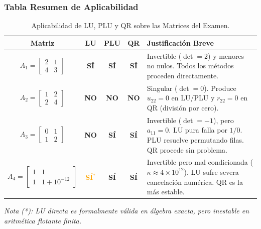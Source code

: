 \documentclass[11pt,a4paper]{article}
\theoremstyle{definition}
\theoremstyle{remark}
\begin{document}
\subsubsection{Tabla Resumen de Aplicabilidad}

\begin{table}[h!]
    \centering
    \renewcommand{\arraystretch}{1.3}
    \caption{Aplicabilidad de LU, PLU y QR sobre las Matrices del Examen.}
    \label{tab:resumen_matrices_examen}
    \begin{tabular}{ccccp{8.5cm}}
        \toprule
        \textbf{Matriz} & \textbf{LU} & \textbf{PLU} & \textbf{QR} & \textbf{Justificación Breve} \\
        \midrule
        $A_1 = \begin{bmatrix} 2 & 1 \\ 4 & 3 \end{bmatrix}$ & 
        \textcolor{mygreen}{\textbf{SÍ}} & 
        \textcolor{mygreen}{\textbf{SÍ}} & 
        \textcolor{mygreen}{\textbf{SÍ}} & 
        Invertible ($\det=2$) y menores no nulos. Todos los métodos proceden directamente. \\
        \midrule
        $A_2 = \begin{bmatrix} 1 & 2 \\ 2 & 4 \end{bmatrix}$ & 
        \textcolor{myred}{\textbf{NO}} & 
        \textcolor{myred}{\textbf{NO}} & 
        \textcolor{myred}{\textbf{NO}} & 
        Singular ($\det=0$). Produce $u_{22}=0$ en LU/PLU y $r_{22}=0$ en QR (división por cero). \\
        \midrule
        $A_3 = \begin{bmatrix} 0 & 1 \\ 1 & 2 \end{bmatrix}$ & 
        \textcolor{myred}{\textbf{NO}} & 
        \textcolor{mygreen}{\textbf{SÍ}} & 
        \textcolor{mygreen}{\textbf{SÍ}} & 
        Invertible ($\det=-1$), pero $a_{11}=0$. LU pura falla por $1/0$. PLU resuelve permutando filas. QR procede sin problema. \\
        \midrule
        $A_4 = \begin{bmatrix} 1 & 1 \\ 1 & 1 + 10^{-12} \end{bmatrix}$ & 
        \textcolor{orange}{\textbf{SÍ$^*$}} & 
        \textcolor{mygreen}{\textbf{SÍ}} & 
        \textcolor{mygreen}{\textbf{SÍ}} & 
        Invertible pero mal condicionada ($\kappa \approx 4 \times 10^{12}$). LU sufre severa cancelación numérica. QR es la más estable. \\
        \bottomrule
    \end{tabular}
    \par \vspace{0.15cm}
    \footnotesize \textit{Nota (*): LU directa es formalmente válida en álgebra exacta, pero inestable en aritmética flotante finita.}
\end{table}
\end{document}
